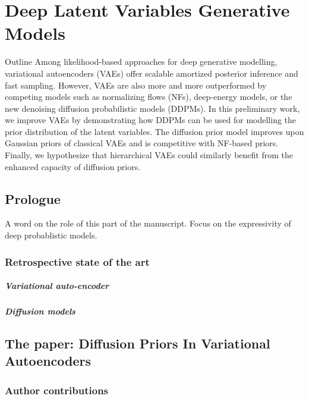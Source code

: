 \chapter{Deep Latent Variables Generative Models}\label{ch:03}

\begin{remark}{Outline}
Among likelihood-based approaches for deep generative modelling, variational autoencoders (VAEs) offer scalable amortized posterior inference and fast sampling. However, VAEs are also more and more outperformed by competing models such as normalizing flows (NFs), deep-energy models, or the new denoising diffusion probabilistic models (DDPMs).
In this preliminary work, we improve VAEs by demonstrating how DDPMs can be used for modelling the prior distribution of the latent variables. The diffusion prior model improves upon Gaussian priors of classical VAEs and is competitive with NF-based priors.
Finally, we hypothesize that hierarchical VAEs could similarly benefit from the enhanced capacity of diffusion priors.
\end{remark}
\section{Prologue}
A word on the role of this part of the manuscript. Focus on the expressivity of deep probablistic models.

\subsection{Retrospective state of the art}

\paragraph{Variational auto-encoder}

\paragraph{Diffusion models}

\section{The paper: Diffusion Priors In Variational Autoencoders}

\subsection{Author contributions}

